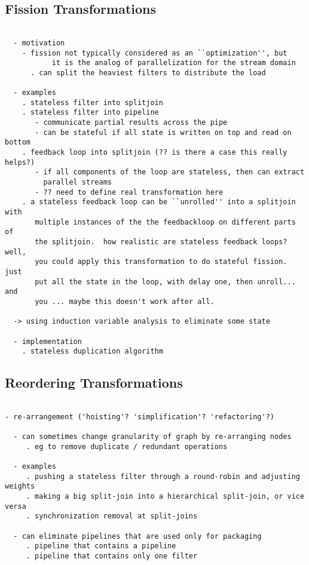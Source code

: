\subsection{Fission Transformations}

\begin{verbatim}

  - motivation
    - fission not typically considered as an ``optimization'', but
           it is the analog of parallelization for the stream domain
      . can split the heaviest filters to distribute the load

  - examples
    . stateless filter into splitjoin
    . stateless filter into pipeline
       - communicate partial results across the pipe
       - can be stateful if all state is written on top and read on bottom
    . feedback loop into splitjoin (?? is there a case this really helps?)
       - if all components of the loop are stateless, then can extract
         parallel streams
       - ?? need to define real transformation here
    . a stateless feedback loop can be ``unrolled'' into a splitjoin with
       multiple instances of the the feedbackloop on different parts of
       the splitjoin.  how realistic are stateless feedback loops?  well,
       you could apply this transformation to do stateful fission.  just
       put all the state in the loop, with delay one, then unroll... and
       you ... maybe this doesn't work after all.

  -> using induction variable analysis to eliminate some state

  - implementation
    . stateless duplication algorithm

\end{verbatim}

\subsection{Reordering Transformations}

\begin{verbatim}

- re-arrangement ('hoisting'? 'simplification'? 'refactoring'?)

  - can sometimes change granularity of graph by re-arranging nodes
     . eg to remove duplicate / redundant operations

  - examples
     . pushing a stateless filter through a round-robin and adjusting weights
     . making a big split-join into a hierarchical split-join, or vice versa
     . synchronization removal at split-joins

  - can eliminate pipelines that are used only for packaging
     . pipeline that contains a pipeline
     . pipeline that contains only one filter

\end{verbatim}



